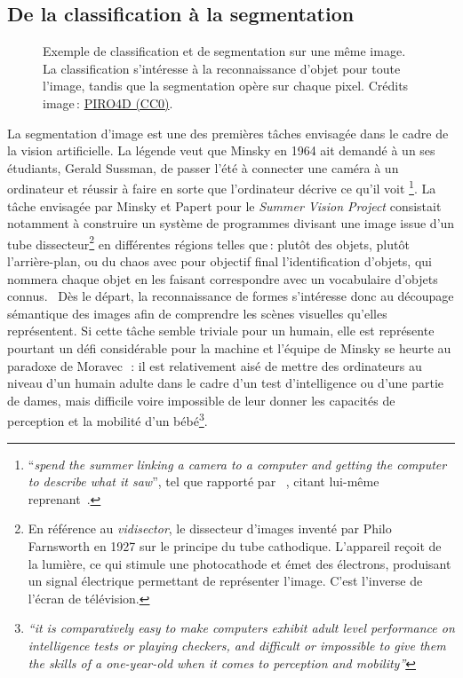 \subsection{De la classification à la segmentation}

\begin{figure}[t]
  \resizebox{\textwidth}{!}{}
  \caption{Exemple de classification et de segmentation sur une même image. La classification s'intéresse à la reconnaissance d'objet pour toute l'image, tandis que la segmentation opère sur chaque pixel. {\small Crédits image\,: \href{https://pixabay.com/en/balloon-hot-air-balloon-ride-mission-2331488/}{PIRO4D (CC0)}}.}
  \label{fig:classif_vs_seg}
\end{figure}

La segmentation d'image est une des premières tâches envisagée dans le cadre de la vision artificielle.
La légende veut que Minsky en 1964 ait demandé à un ses étudiants, Gerald Sussman, de \og passer l'été à connecter une caméra à un ordinateur et réussir à faire en sorte que l'ordinateur décrive ce qu'il voit \fg\footnote{``\emph{spend the summer linking a camera to a computer and getting the computer to describe what it saw}'', tel que rapporté par ~\citet{szeliski_computer_2011}, citant lui-même~\citet{boden_mind_2008} reprenant~\citet{crevier_ai_1993}.}.
La tâche envisagée par Minsky et Papert pour le \emph{Summer Vision Project} consistait notamment à \og construire un système de programmes divisant une image issue d'un tube dissecteur\footnote{En référence au \emph{vidisector}, le dissecteur d'images inventé par Philo Farnsworth en 1927 sur le principe du tube cathodique. L'appareil reçoit de la lumière, ce qui stimule une photocathode et émet des électrons, produisant un signal électrique permettant de représenter l'image. C'est l'inverse de l'écran de télévision.} en différentes régions telles que\,: plutôt des objets, plutôt l'arrière-plan, ou du chaos\fg{} avec pour objectif final \og l'identification d'objets, qui nommera chaque objet en les faisant correspondre avec un vocabulaire d'objets connus.\fg{}~\cite{papert_summer_1966}
Dès le départ, la reconnaissance de formes s'intéresse donc au découpage sémantique des images afin de comprendre les scènes visuelles qu'elles représentent.
Si cette tâche semble triviale pour un humain, elle est représente pourtant un défi considérable pour la machine et l'équipe de Minsky se heurte au paradoxe de Moravec~\cite{moravec_mind_1988}\,: \og il est relativement aisé de mettre des ordinateurs au niveau d'un humain adulte dans le cadre d'un test d'intelligence ou d'une partie de dames, mais difficile voire impossible de leur donner les capacités de perception et la mobilité d'un bébé\fg{}\footnote{\emph{``it is comparatively easy to make computers exhibit adult level performance on intelligence tests or playing checkers, and difficult or impossible to give them the skills of a one-year-old when it comes to perception and mobility''}}.

